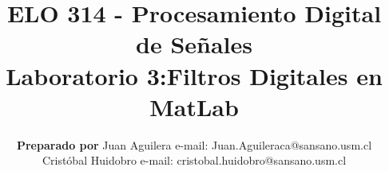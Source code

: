 \documentclass[letterpaper,onecolumn,10pt,journal,final]{IEEEtran}
\begin{document}
\title{ELO 314 - Procesamiento Digital de Señales\\ Laboratorio 3:Filtros Digitales en MatLab}

\author{\textbf{Preparado por}
\vspace{1 mm}Juan Aguilera e-mail: Juan.Aguileraca@sansano.usm.cl \\
            Cristóbal Huidobro e-mail: 
cristobal.huidobro@sansano.usm.cl}

\maketitle

\vspace{-1 cm}

%
%
\end{document}
